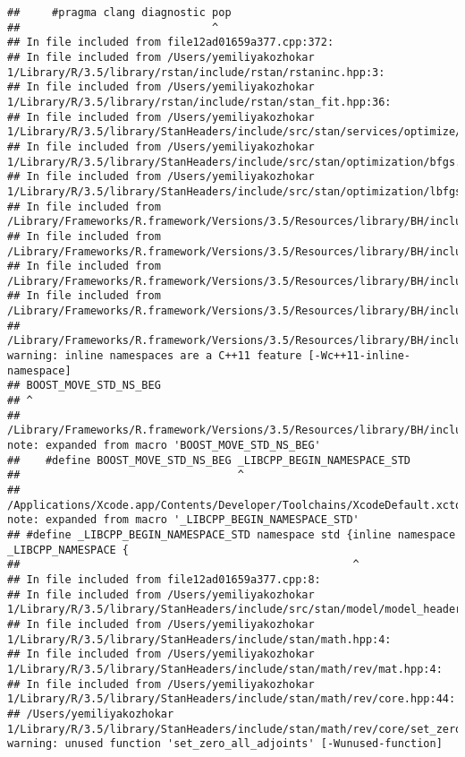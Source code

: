\documentclass[]{article}
\begin{document}
\begin{verbatim}
##     #pragma clang diagnostic pop
##                              ^
## In file included from file12ad01659a377.cpp:372:
## In file included from /Users/yemiliyakozhokar 1/Library/R/3.5/library/rstan/include/rstan/rstaninc.hpp:3:
## In file included from /Users/yemiliyakozhokar 1/Library/R/3.5/library/rstan/include/rstan/stan_fit.hpp:36:
## In file included from /Users/yemiliyakozhokar 1/Library/R/3.5/library/StanHeaders/include/src/stan/services/optimize/bfgs.hpp:11:
## In file included from /Users/yemiliyakozhokar 1/Library/R/3.5/library/StanHeaders/include/src/stan/optimization/bfgs.hpp:9:
## In file included from /Users/yemiliyakozhokar 1/Library/R/3.5/library/StanHeaders/include/src/stan/optimization/lbfgs_update.hpp:6:
## In file included from /Library/Frameworks/R.framework/Versions/3.5/Resources/library/BH/include/boost/circular_buffer.hpp:54:
## In file included from /Library/Frameworks/R.framework/Versions/3.5/Resources/library/BH/include/boost/circular_buffer/details.hpp:20:
## In file included from /Library/Frameworks/R.framework/Versions/3.5/Resources/library/BH/include/boost/move/move.hpp:30:
## In file included from /Library/Frameworks/R.framework/Versions/3.5/Resources/library/BH/include/boost/move/iterator.hpp:27:
## /Library/Frameworks/R.framework/Versions/3.5/Resources/library/BH/include/boost/move/detail/iterator_traits.hpp:29:1: warning: inline namespaces are a C++11 feature [-Wc++11-inline-namespace]
## BOOST_MOVE_STD_NS_BEG
## ^
## /Library/Frameworks/R.framework/Versions/3.5/Resources/library/BH/include/boost/move/detail/std_ns_begin.hpp:18:34: note: expanded from macro 'BOOST_MOVE_STD_NS_BEG'
##    #define BOOST_MOVE_STD_NS_BEG _LIBCPP_BEGIN_NAMESPACE_STD
##                                  ^
## /Applications/Xcode.app/Contents/Developer/Toolchains/XcodeDefault.xctoolchain/usr/include/c++/v1/__config:390:52: note: expanded from macro '_LIBCPP_BEGIN_NAMESPACE_STD'
## #define _LIBCPP_BEGIN_NAMESPACE_STD namespace std {inline namespace _LIBCPP_NAMESPACE {
##                                                    ^
## In file included from file12ad01659a377.cpp:8:
## In file included from /Users/yemiliyakozhokar 1/Library/R/3.5/library/StanHeaders/include/src/stan/model/model_header.hpp:4:
## In file included from /Users/yemiliyakozhokar 1/Library/R/3.5/library/StanHeaders/include/stan/math.hpp:4:
## In file included from /Users/yemiliyakozhokar 1/Library/R/3.5/library/StanHeaders/include/stan/math/rev/mat.hpp:4:
## In file included from /Users/yemiliyakozhokar 1/Library/R/3.5/library/StanHeaders/include/stan/math/rev/core.hpp:44:
## /Users/yemiliyakozhokar 1/Library/R/3.5/library/StanHeaders/include/stan/math/rev/core/set_zero_all_adjoints.hpp:14:17: warning: unused function 'set_zero_all_adjoints' [-Wunused-function]

\end{verbatim}
\end{document}
